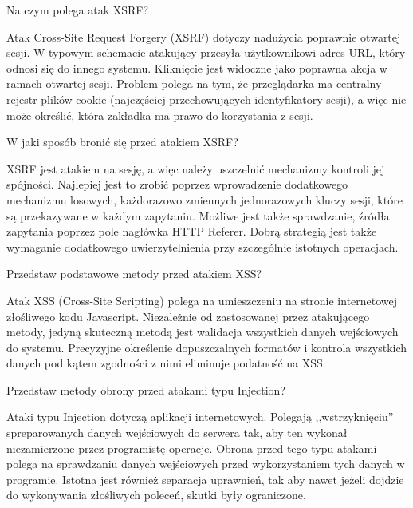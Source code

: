 \documentclass[answers,11pt]{exam}
\begin{document}
\begin{questions}
\question Na czym polega atak XSRF?
\begin{solution}
Atak Cross-Site Request Forgery (XSRF) dotyczy nadużycia poprawnie otwartej sesji. W typowym schemacie atakujący przesyła użytkownikowi adres URL, który odnosi się do innego systemu. Kliknięcie jest widoczne jako poprawna akcja w ramach otwartej sesji. Problem polega na tym, że przeglądarka ma centralny rejestr plików cookie (najczęściej przechowujących identyfikatory sesji), a więc nie może określić, która zakładka ma prawo do korzystania z sesji. 
\end{solution}

\question W jaki sposób bronić się przed atakiem XSRF?
\begin{solution}
XSRF jest atakiem na sesję, a więc należy uszczelnić mechanizmy kontroli jej spójności. Najlepiej jest to zrobić poprzez wprowadzenie dodatkowego mechanizmu losowych, każdorazowo zmiennych jednorazowych kluczy sesji, które są przekazywane w każdym zapytaniu. Możliwe jest także sprawdzanie, źródła zapytania poprzez pole nagłówka HTTP Referer. Dobrą strategią jest także wymaganie dodatkowego uwierzytelnienia przy szczególnie istotnych operacjach. 
\end{solution}


\question Przedstaw podstawowe metody przed atakiem XSS?
\begin{solution}
Atak XSS (Cross-Site Scripting) polega na umieszczeniu na stronie internetowej złośliwego kodu Javascript. Niezależnie od zastosowanej przez atakującego metody, jedyną skuteczną metodą jest walidacja wszystkich danych wejściowych do systemu. Precyzyjne określenie dopuszczalnych formatów i kontrola wszystkich danych pod kątem zgodności z nimi eliminuje podatność na XSS.  
\end{solution}

\question Przedstaw metody obrony przed atakami typu Injection?
\begin{solution}
Ataki typu Injection dotyczą aplikacji internetowych. Polegają ,,wstrzyknięciu'' spreparowanych danych wejściowych do serwera tak, aby ten wykonał niezamierzone przez programistę operacje. 
Obrona przed tego typu atakami polega na sprawdzaniu danych wejściowych przed wykorzystaniem tych danych w programie. Istotna jest również separacja uprawnień, tak aby nawet jeżeli dojdzie do wykonywania złośliwych poleceń, skutki były ograniczone.
\end{solution}


\end{questions}
\end{document}
